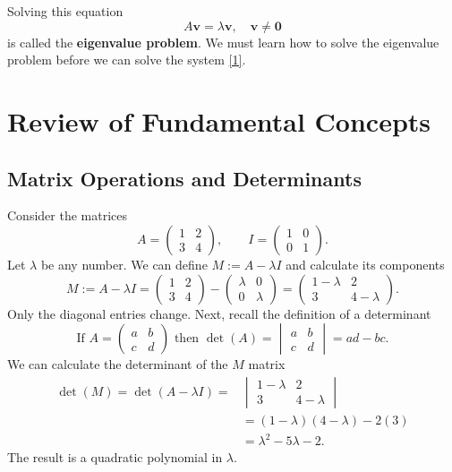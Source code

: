 \documentclass[10pt,letterpaper]{article}
\begin{document}
Solving this equation 
\begin{equation}    
    A\mathbf{v} = \lambda \mathbf{v}, \quad \mathbf{v}\ne\mathbf{0}
\end{equation}
is called the \textbf{eigenvalue problem}. We must learn how to solve the eigenvalue problem before we can solve the system \eqref{1}.


\section{Review of Fundamental Concepts}

\subsection{Matrix Operations and Determinants}
Consider the matrices
\[
A=\begin{pmatrix}1&2\\3&4\end{pmatrix},
\qquad I=\begin{pmatrix}1&0\\0&1\end{pmatrix}.
\]
Let $\lambda$ be any number. We can define $M:=A-\lambda I$ and calculate its components
\[
M:=A-\lambda I
=\begin{pmatrix}1&2\\3&4\end{pmatrix}
-\begin{pmatrix}\lambda&0\\0&\lambda\end{pmatrix}
=\begin{pmatrix}1-\lambda&2\\3&4-\lambda\end{pmatrix}.
\]
Only the diagonal entries change. Next, recall the definition of a determinant 
$$
\text{If } A=\begin{pmatrix}
    a & b\\
    c & d
\end{pmatrix} \text{ then } \det(A) = \begin{vmatrix}
    a & b\\
    c & d
\end{vmatrix}= ad-bc.
$$
We can calculate the determinant of the $M$ matrix 
\begin{align*}
\det(M)=\det(A-\lambda I)=& \begin{vmatrix}
    1-\lambda & 2\\
    3 & 4-\lambda
\end{vmatrix}\\
&=(1-\lambda)(4-\lambda)-2(3)\\
&=\lambda^2-5\lambda-2.
\end{align*}
The result is a quadratic polynomial in $\lambda$.
\end{document}
